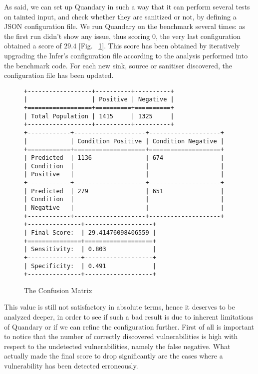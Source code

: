 \documentclass[../Report.tex]{subfiles}
\begin{document}
As said, we can set up Quandary in such a way that it can perform several tests on tainted input, and check whether they are sanitized or not, by defining a JSON configuration file. We run Quandary on the benchmark several times: as the first run didn't show any issue, thus scoring 0, the very last configuration obtained a score of $29.4$ [Fig. ~\ref{table:confusionmatrix}]. 
This score has been obtained by iteratively upgrading the Infer's configuration file according to the analysis performed into the benchmark code. For each new sink, source or sanitiser discovered, the configuration file has been updated.\\


\begin{figure}
		\small{
			\begin{verbatim}
+------------------+----------+----------+
|                  | Positive | Negative |
+==================+==========+==========+
| Total Population | 1415     | 1325     |
+------------------+----------+----------+
+------------+--------------------+--------------------+
|            | Condition Positive | Condition Negative |
+============+====================+====================+
| Predicted  | 1136               | 674                |
| Condition  |                    |                    |
| Positive   |                    |                    |
+------------+--------------------+--------------------+
| Predicted  | 279                | 651                |
| Condition  |                    |                    |
| Negative   |                    |                    |
+------------+--------------------+--------------------+
+---------------+-------------------+
| Final Score:  | 29.41476098406559 |
+===============+===================+
| Sensitivity:  | 0.803             |
+---------------+-------------------+
| Specificity:  | 0.491             |
+---------------+-------------------+
			\end{verbatim}
		}
	\label{table:confusionmatrix}
	\caption{The Confusion Matrix}
\end{figure}

This value is still not satisfactory in absolute terms, hence it deserves to be analyzed deeper, in order to see if such a bad result is due to inherent limitations of Quandary or if we can refine the configuration further. First of all is important to notice that the number of correctly discovered vulnerabilities is high with respect to the undetected vulnerabilities, namely the false negative. What actually made the final score to drop significantly are the cases where a vulnerability has been detected erroneously.\\
\end{document}

